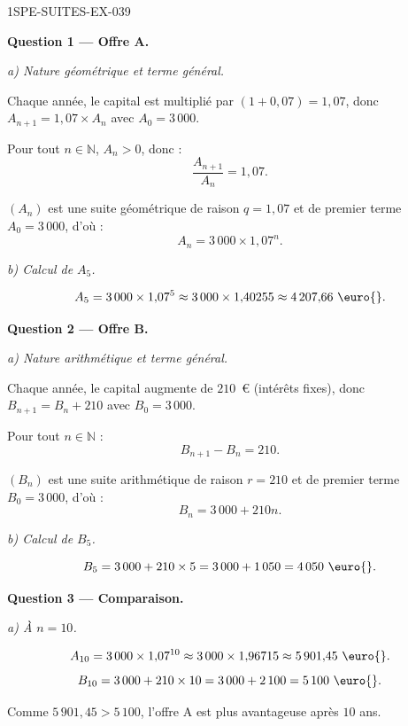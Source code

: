 \begin{corrige}{1SPE-SUITES-EX-039}

\textbf{Question 1 — Offre A.}

\textit{a) Nature géométrique et terme général.}

Chaque année, le capital est multiplié par $(1 + 0{,}07) = 1{,}07$, donc $A_{n+1} = 1{,}07 \times A_n$ avec $A_0 = 3\,000$.

Pour tout $n \in \mathbb{N}$, $A_n > 0$, donc :
\[
  \frac{A_{n+1}}{A_n} = 1{,}07.
\]


$(A_n)$ est une suite géométrique de raison $q = 1{,}07$ et de premier terme $A_0 = 3\,000$, d'où :
\[
  A_n = 3\,000 \times 1{,}07^n.
\]

\textit{b) Calcul de $A_5$.}

\[
  A_5 = 3\,000 \times 1{,}07^5 \approx 3\,000 \times 1{,}40255 \approx 4\,207{,}66 \text{ \euro{}}.
\]

\medskip
\textbf{Question 2 — Offre B.}

\textit{a) Nature arithmétique et terme général.}

Chaque année, le capital augmente de $210$~\euro{} (intérêts fixes), donc $B_{n+1} = B_n + 210$ avec $B_0 = 3\,000$.

Pour tout $n \in \mathbb{N}$ :
\[
  B_{n+1} - B_n = 210.
\]


$(B_n)$ est une suite arithmétique de raison $r = 210$ et de premier terme $B_0 = 3\,000$, d'où :
\[
  B_n = 3\,000 + 210n.
\]

\textit{b) Calcul de $B_5$.}

\[
  B_5 = 3\,000 + 210 \times 5 = 3\,000 + 1\,050 = 4\,050 \text{ \euro{}}.
\]

\medskip
\textbf{Question 3 — Comparaison.}

\textit{a) À $n = 10$.}

\[
  A_{10} = 3\,000 \times 1{,}07^{10} \approx 3\,000 \times 1{,}96715 \approx 5\,901{,}45 \text{ \euro{}}.
\]
\[
  B_{10} = 3\,000 + 210 \times 10 = 3\,000 + 2\,100 = 5\,100 \text{ \euro{}}.
\]

Comme $5\,901{,}45 > 5\,100$, l'offre A est plus avantageuse après $10$ ans.


\end{corrige}
